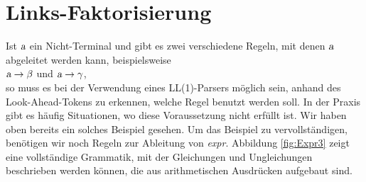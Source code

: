 \section{Links-Faktorisierung}
Ist $\textsl{a}$ ein Nicht-Terminal
und gibt es zwei verschiedene Regeln, mit denen $\textsl{a}$ abgeleitet werden kann, beispielsweise
\\[0.2cm]
\hspace*{1.3cm}
$\textsl{a} \rightarrow \beta$ \quad und \quad $\textsl{a} \rightarrow \gamma$,
\\[0.2cm]
so muss es bei der Verwendung eines LL(1)-Parsers m\"oglich sein, anhand des Look-Ahead-Tokens zu
erkennen, welche Regel benutzt werden soll.  In der Praxis gibt es h\"aufig Situationen, wo
diese Voraussetzung nicht erf\"ullt ist.  Wir haben oben bereits ein solches Beispiel
gesehen.  Um das Beispiel zu vervollst\"andigen, ben\"otigen wir noch Regeln zur Ableitung von
\textsl{expr}.  Abbildung \ref{fig:Expr3} zeigt eine vollst\"andige Grammatik, mit der
Gleichungen und Ungleichungen beschrieben werden k\"onnen, die aus arithmetischen Ausdr\"ucken
aufgebaut sind.


